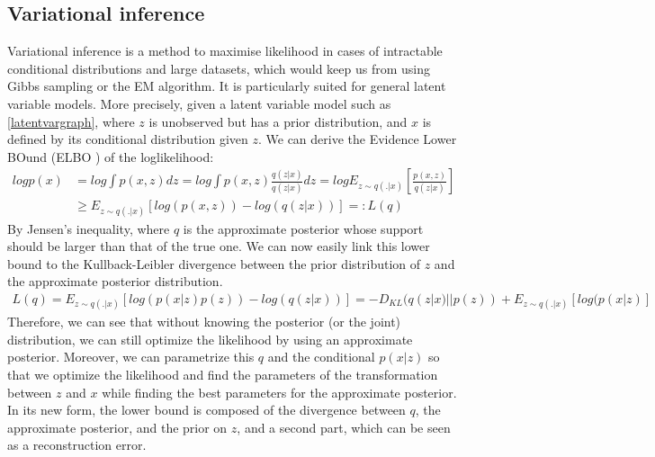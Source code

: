 \documentclass[letterpaper, twoside]{article}
\begin{document}
  \subsection{Variational inference}
    Variational inference is a method to maximise likelihood in cases of intractable conditional distributions and large datasets, which would keep us from using Gibbs sampling or the EM algorithm. It is particularly suited for general latent variable models. More precisely, given a latent variable model such as \ref{latentvargraph}, where $z$ is unobserved but has a prior distribution, and $x$ is defined by its conditional distribution given $z$.
     We can derive the Evidence Lower BOund (ELBO \cite{Jordan:VarMethods}) of the loglikelihood:\\
    \begin{align}
    log p(x) & = log \int p(x, z)dz = log \int p(x, z) \frac{q(z|x)}{q(z|x)} dz = log E_{z\sim q(.|x)}[\frac{p(x, z)}{q(z|x)}] \\
             & \geq E_{z\sim q(.|x)}[log(p(x, z)) - log (q(z|x))] =: L(q)
    \end{align}
    By Jensen's inequality, where $q$ is the approximate posterior whose support should be larger than that of the true one.
    We can now easily link this lower bound to the Kullback-Leibler divergence between the prior distribution of $z$ and the approximate posterior distribution.
    \begin{align}
    L(q) = E_{z\sim q(.|x)}[log(p(x| z)p(z)) - log (q(z|x))] = -D_{KL} (q(z|x)||p(z)) + E_{z\sim q(.|x)}[log(p(x| z)]
    \end{align}
    Therefore, we can see that without knowing the posterior (or the joint) distribution, we can still optimize the likelihood by using an approximate posterior. Moreover, we can parametrize this $q$ and the conditional $p(x|z)$ so that we optimize the likelihood and find the parameters of the transformation between $z$ and $x$ while finding the best parameters for the approximate posterior. In its new form, the lower bound is composed of the divergence between $q$, the approximate posterior, and the prior on $z$, and a second part, which can be seen as a reconstruction error.\\
\end{document}
